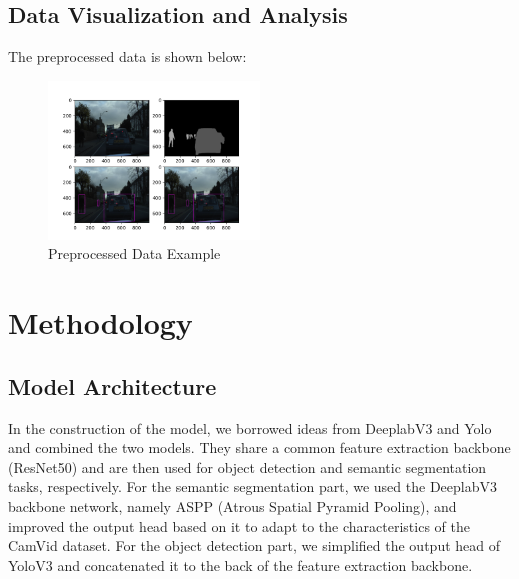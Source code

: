 \documentclass[conference]{IEEEtran}
\begin{document}
\subsection{Data Visualization and Analysis}

The preprocessed data is shown below:

\begin{figure}[htbp]
    \centerline{\includegraphics[width=0.5\textwidth]{fig/data.png}}
    \caption{Preprocessed Data Example}
    \label{fig:data}
\end{figure}


\section{Methodology}
\subsection{Model Architecture}


In the construction of the model, we borrowed ideas from DeeplabV3 and Yolo and combined the two models. They share a common feature extraction backbone (ResNet50) and are then used for object detection and semantic segmentation tasks, respectively. For the semantic segmentation part, we used the DeeplabV3 backbone network, namely ASPP (Atrous Spatial Pyramid Pooling), and improved the output head based on it to adapt to the characteristics of the CamVid dataset. For the object detection part, we simplified the output head of YoloV3 and concatenated it to the back of the feature extraction backbone.
\end{document}
